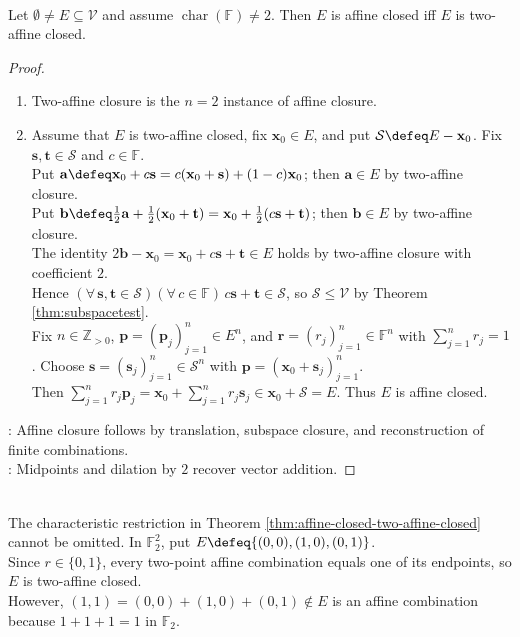 \begin{theorem} \label{thm:affine-closed-two-affine-closed} \\
Let $\emptyset\neq E\subseteq\mathcal{V}$ and assume $\operatorname{char}(\mathbb{F})\neq2$. Then $E$ is affine closed iff $E$ is two-affine closed.
\begin{proof}
\begin{enumerate}[label=\roman*.]
\setlength{\itemsep}{0pt}
\item[$(\Rightarrow)$] Two-affine closure is the $n=2$ instance of affine closure.
\item[$(\Leftarrow)$] Assume that $E$ is two-affine closed, fix $\mathbf{x}_0\in E$, and put $\mathcal{S}\defeq E-\mathbf{x}_0$. Fix $\mathbf{s},\mathbf{t}\in\mathcal{S}$ and $c\in\mathbb{F}$.\\
Put $\mathbf{a}\defeq\mathbf{x}_0+c\mathbf{s}=c(\mathbf{x}_0+\mathbf{s})+(1-c)\mathbf{x}_0$; then $\mathbf{a}\in E$ by two-affine closure.\\
Put $\mathbf{b}\defeq\frac{1}{2}\mathbf{a}+\frac{1}{2}(\mathbf{x}_0+\mathbf{t})=\mathbf{x}_0+\frac{1}{2}(c\mathbf{s}+\mathbf{t})$; then $\mathbf{b}\in E$ by two-affine closure.\\
The identity $2\mathbf{b}-\mathbf{x}_0=\mathbf{x}_0+c\mathbf{s}+\mathbf{t}\in E$ holds by two-affine closure with coefficient $2$.\\
Hence $(\forall\,\mathbf{s},\mathbf{t}\in\mathcal{S})(\forall\,c\in\mathbb{F})\,c\mathbf{s}+\mathbf{t}\in\mathcal{S}$, so $\mathcal{S}\leq\mathcal{V}$ by Theorem \ref{thm:subspacetest}.\\
Fix $n\in\mathbb{Z}_{>0}$, $\mathbf{p}=(\mathbf{p}_j)_{j=1}^n\in E^n$, and $\mathbf{r}=(r_j)_{j=1}^n\in\mathbb{F}^n$ with $\sum\limits_{j=1}^n r_j=1$. Choose $\mathbf{s}=(\mathbf{s}_j)_{j=1}^n\in\mathcal{S}^n$ with $\mathbf{p}=(\mathbf{x}_0+\mathbf{s}_j)_{j=1}^n$.\\
Then $\sum\limits_{j=1}^n r_j\mathbf{p}_j=\mathbf{x}_0+\sum\limits_{j=1}^n r_j\mathbf{s}_j\in\mathbf{x}_0+\mathcal{S}=E$. Thus $E$ is affine closed.
\end{enumerate}
: Affine closure follows by translation, subspace closure, and reconstruction of finite combinations.\\
: Midpoints and dilation by $2$ recover vector addition.
\end{proof}
\end{theorem}

\begin{counterexample} \label{cex:characteristic-two-affine-closure} \\
The characteristic restriction in Theorem \ref{thm:affine-closed-two-affine-closed} cannot be omitted. In $\mathbb{F}_2^2$, put $E\defeq\{(0,0),(1,0),(0,1)\}$.\\
Since $r\in\{0,1\}$, every two-point affine combination equals one of its endpoints, so $E$ is two-affine closed.\\
However, $(1,1)=(0,0)+(1,0)+(0,1)\notin E$ is an affine combination because $1+1+1=1$ in $\mathbb{F}_2$.
\end{counterexample}

